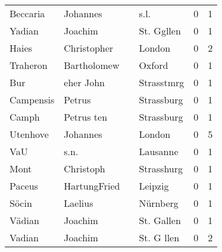 \begin{tabular}{llllrr}
                 Beccaria &                           Johannes &             &                                        s.l. &          0 &         1 \\
                   Yadian &                            Joachim &             &                                  St. Ggllen &          0 &         1 \\
                    Haies &                        Christopher &             &                                      London &          0 &         2 \\
                 Traheron &                        Bartholomew &             &                                      Oxford &          0 &         1 \\
                      Bur &                          eher John &             &                                  Strasstmrg &          0 &         1 \\
                Campensis &                             Petrus &             &                                  Strassburg &          0 &         1 \\
                    Camph &                         Petrus ten &             &                                  Strassburg &          0 &         1 \\
                 Utenhove &                           Johannes &             &                                      London &          0 &         5 \\
                      VaU &                               s.n. &             &                                    Lausanne &          0 &         1 \\
                     Mont &                          Christoph &             &                                  Strasshurg &          0 &         1 \\
                   Paceus &                       HartungFried &             &                                     Leipzig &          0 &         1 \\
                    Söcin &                            Laelius &             &                                    Nürnberg &          0 &         1 \\
                   Vädian &                            Joachim &             &                                  St. Gallen &          0 &         1 \\
                   Vadian &                            Joachim &             &                                  St. G llen &          0 &         2 \\

\end{tabular}
